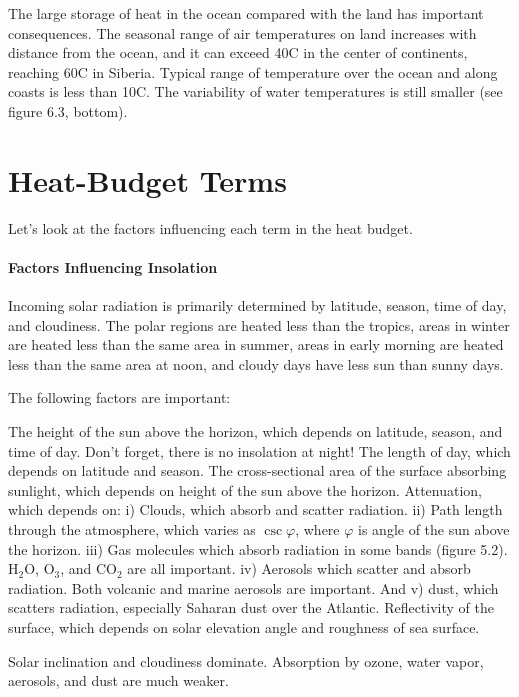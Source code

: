 The large storage of heat in the ocean compared with the land has
important consequences. The seasonal range of air temperatures on land
increases with distance from the ocean, and it can exceed 40\degrees C
in the center of continents, reaching 60\degrees C in Siberia. Typical
range of temperature over the ocean and along coasts is less than
10\degrees C. The variability of water temperatures is still smaller
(see figure 6.3, bottom).

\section{Heat-Budget Terms}
Let's look at the factors influencing each
term in the heat budget.

\paragraph{Factors Influencing Insolation}
Incoming solar radiation is
primarily determined by latitude, season, time of day, and
cloudiness. The polar regions are heated less than the tropics, areas
in winter are heated less than the same area in summer, areas in early
morning are heated less than the same area at noon, and cloudy days
have less sun than sunny days.

The following factors are important:
\begin{enumerate}
\vitem
The height of the sun above the
horizon, which depends on latitude, season, and time of day. Don't
forget, there is no insolation at night!
\vitem
The length of day, which depends on latitude and season.
\vitem
The cross-sectional area of the surface absorbing sunlight, which
depends on height of the sun above the horizon.
\vitem
Attenuation, which depends on: i) Clouds, which absorb and scatter
radiation. ii) Path length through the atmosphere, which varies as
$\csc \varphi$, where $\varphi$ is angle of the sun above the
horizon. iii) Gas molecules which absorb radiation in some bands
(figure 5.2). H$_2$O, O$_3$, and CO$_2$ are all important. iv)
Aerosols which scatter and absorb radiation. Both volcanic and marine
aerosols are important. And v) dust, which scatters radiation,
especially Saharan dust over the Atlantic.
\vitem
Reflectivity of the surface, which depends on solar elevation angle
and roughness of sea surface.
\end{enumerate}
Solar inclination and cloudiness dominate. Absorption by ozone, water
vapor, aerosols, and dust are much weaker.

